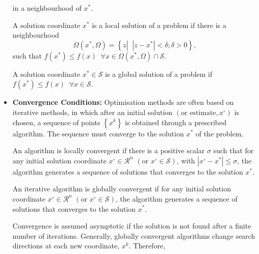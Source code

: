 \begin{itemize}
\begin{lem}
{\begin{enumerate}[(a)]
    \end{enumerate}}
 in a neighbourhood of $x^{\ast}$.
\end{lem}

\begin{defn}
   A solution coordinate $x^{\ast}$ is a local solution of a problem if there is a neighbourhood 
   \begin{displaymath}
           \Omega\left(x^{\ast},\Omega\right) = \left\{ z \left|\;\;\left|z-x^{\ast}\right| < \delta ; \delta > 0\right.\right\},
   \end{displaymath}
   such that $f\left(x^{\ast}\right)\leq f\left(x\right)\;\;\forall x\in\Omega\left(x^{\ast},\Omega\right) \cap \mathcal{S}$.
\end{defn}

\begin{defn}
   A solution coordinate $x^{\ast}\in\mathcal{S}$ is a global solution of a problem if $f\left(x^{\ast}\right)\leq f\left(x\right)\;\;\forall x\in\mathcal{S}$.
\end{defn}

\item {\bf Convergence Conditions:} Optimisation methods are often based on iterative methods, in which after an initial solution $\left(\text{or estimate}, x^{\circ}\right)$ is chosen, a sequence of points $\left\{x^{k}\right\}$ is obtained through a prescribed algorithm. The sequence must converge to the solution $x^{\ast}$ of the problem.
\begin{defn}
   An algorithm is locally convergent if there is a positive scalar $\sigma$ such that for any initial solution coordinate $x^{\circ}\in\mathcal{R}^{n}$ $\left(\text{or } x^{\circ}\in\mathcal{S}\right)$, with $\left|x^{\circ}-x^{\ast}\right|\leq\sigma$, the algorithm generates a sequence of solutions that converges to the solution $x^{\ast}$.
\end{defn}

\begin{defn}
   An iterative algorithm is globally convergent if for any initial solution coordinate $x^{\circ}\in\mathcal{R}^{n}$ $\left(\text{or } x^{\circ}\in\mathcal{S}\right)$, the algorithm generates a sequence of solutions that converges to the solution $x^{\ast}$.
\end{defn}

\bigskip
Convergence is assumed asymptotic if the solution is not found after a finite number of iterations. Generally, globally convergent algorithms change search directions at each new coordinate, $x^{k}$. Therefore,


\end{itemize}
